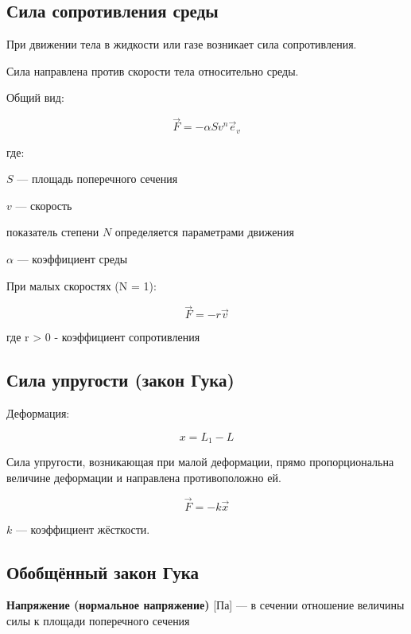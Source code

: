 \documentclass[a4paper,12pt]{article}
\begin{document}
\subsection*{Сила сопротивления среды}

При движении тела в жидкости или газе возникает сила сопротивления.

Сила направлена против скорости тела относительно среды.

Общий вид:

\[
\vec F = - \alpha S v^n \vec e_v
\]

где:

$S$ — площадь поперечного сечения

$v$ — скорость

показатель степени $N$ определяется параметрами движения

$\alpha$ — коэффициент среды

При малых скоростях (N = 1):

\[
\vec F = - r \vec v
\]

где r > 0 - коэффициент сопротивления

\vspace{0.8em}

\subsection*{Сила упругости (закон Гука)}

Деформация:

\[
x = L_1 - L
\]

\begin{theorembox}
Сила упругости, возникающая при малой деформации, прямо пропорциональна величине деформации и направлена противоположно ей.
\end{theorembox}

\[
\vec F = -k \vec x
\]

$k$ — коэффициент жёсткости.

\vspace{0.8em}

\subsection*{Обобщённый закон Гука}

\begin{definitionbox}
\textbf{Напряжение (нормальное напряжение)} [Па] — в сечении отношение величины силы к площади поперечного сечения
\end{definitionbox}
\end{document}
